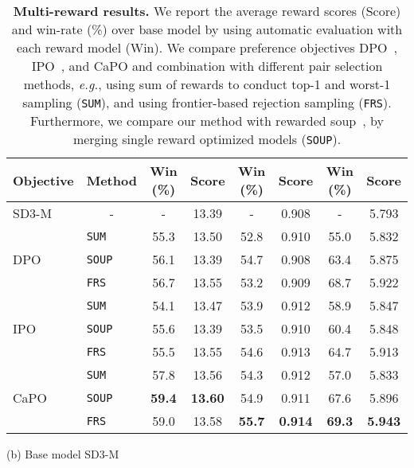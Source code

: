\begin{table*}[t]
\begin{minipage}{0.49\textwidth}
\begin{tabular}{ll  cc cc cc  }
\cmidrule(lr){3-4}\cmidrule(lr){5-6} \cmidrule(lr){7-8}
Objective & Method  & Win (\%) & Score & Win (\%) & Score & Win (\%) & Score\\
\midrule
SD3-M & \multicolumn{1}{c}{-} & - & 13.39 & - & 0.908 & - & 5.793\\
\midrule
\multirow{3}{*}{DPO} 
& {\tt{SUM}} & 55.3 & 13.50 & 52.8 & 0.910 & 55.0 & 5.832 \\
& {\tt{SOUP}} & 56.1 & 13.39 & 54.7 & 0.908 & 63.4 & 5.875 \\
& {\tt{FRS}} & 56.7 & 13.55 & 53.2 & 0.909 & 68.7 & 5.922 \\
\midrule
\multirow{3}{*}{IPO} 
& {\tt{SUM}}  & 54.1 & 13.47 & 53.9 & 0.912 & 58.9 & 5.847 \\
& {\tt{SOUP}} & 55.6 & 13.39 & 53.5 & 0.910 & 60.4 & 5.848 \\
& {\tt{FRS}}  & 55.5 & 13.55 & 54.6 & 0.913 & 64.7 & 5.913 \\
\midrule
\multirow{3}{*}{CaPO} 
& {\tt{SUM}}  & 57.8 & 13.56 & 54.3 & 0.912 & 57.0 & 5.833 \\
& {\tt{SOUP}} & {\bf 59.4} & {\bf 13.60} & 54.9 & 0.911 & 67.6 & 5.896 \\
& {\tt{FRS}}  & 59.0 & 13.58 & {\bf 55.7} & {\bf 0.914} & {\bf 69.3} & {\bf 5.943} \\
\bottomrule
\end{tabular}
\caption*{(b) Base model SD3-M}
\end{minipage}
\vspace{-2mm}
\caption{
\textbf{Multi-reward results.} We report the average reward scores (Score) and win-rate (\%) over base model by using automatic evaluation with each reward model (Win).
We compare preference objectives DPO~\cite{wallace2023diffusion}, IPO~\cite{azar2024general}, and CaPO and combination with different pair selection methods, \emph{e.g.}, using sum of rewards to conduct top-1 and worst-1 sampling ({\tt{SUM}}), and using frontier-based rejection sampling ({\tt{FRS}}).
Furthermore, we compare our method with rewarded soup~\citep{rame2024rewarded}, by merging single reward optimized models ({\tt{SOUP}}). 
}\label{tab:multi}
\end{table*}

